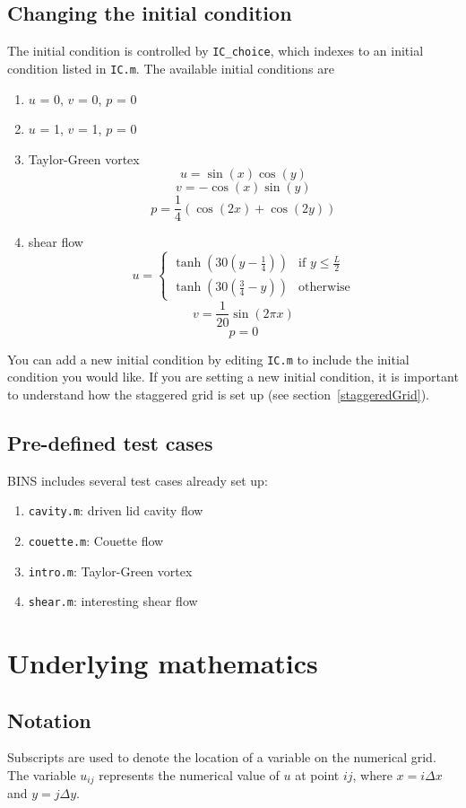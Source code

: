 \documentclass[12pt]{article}
\begin{document}
\subsection{Changing the initial condition}
The initial condition is controlled by \texttt{IC\_choice}, which indexes to an initial condition listed in \texttt{IC.m}.  The available initial conditions are 
\begin{enumerate}
\item $u$ = 0, $v$ = 0, $p$ = 0
\item $u$ = 1, $v$ = 1, $p$ = 0
\item Taylor-Green vortex 
\[ u = \sin(x)\cos(y)\]
\[ v = -\cos(x)\sin(y)\]
\[ p = \frac{1}{4}\left( \cos(2x) + \cos(2y) \right)\]
\item shear flow
\[ u = \begin{cases} \tanh\left(30(y-\frac{1}{4})\right) & \text{if } y \le \frac{L}{2} \\ \tanh\left(30(\frac{3}{4}-y)\right) & \text{otherwise} \end{cases}\]
\[ v = \frac{1}{20}\sin(2\pi x)\]
\[ p = 0\]
\end{enumerate}
You can add a new initial condition by editing \texttt{IC.m} to include the initial condition you would like.  If you are setting a new initial condition, it is important to understand how the staggered grid is set up (see section~\ref{staggeredGrid}).

\subsection{Pre-defined test cases}
BINS includes several test cases already set up:
\begin{enumerate}
\item \texttt{cavity.m}: driven lid cavity flow
\item \texttt{couette.m}: Couette flow
\item \texttt{intro.m}: Taylor-Green vortex
\item \texttt{shear.m}: interesting shear flow
\end{enumerate}

\section{Underlying mathematics}
\subsection{Notation}
Subscripts are used to denote the location of a variable on the numerical grid.  The variable $u_{ij}$ represents the numerical value of $u$ at point $ij$, where $x=i\Delta x$ and $y=j\Delta y$.
\end{document}
